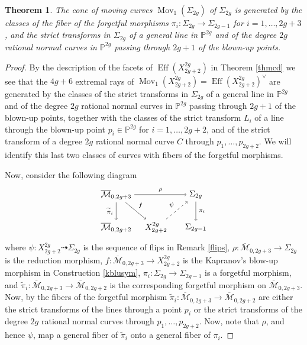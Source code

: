 \documentclass[a4paper,10pt]{amsart}
\newtheorem{thm}{Theorem}[section]
\theoremstyle{definition}
\DeclareMathOperator{\Eff}{Eff}
\DeclareMathOperator{\Mov}{Mov}
\begin{document}
\begin{thm}\label{moving}
The cone of moving curves $\Mov_1(\Sigma_{2g})$ of $\Sigma_{2g}$ is generated by the classes of the fiber of the forgetful morphisms $\pi_i:\Sigma_{2g}\rightarrow\Sigma_{2g-1}$ for $i = 1,\dots,2g+3$, and the strict transforms in $\Sigma_{2g}$ of a general line in $\mathbb{P}^{2g}$ and of the degree $2g$ rational normal curves in $\mathbb{P}^{2g}$ passing through $2g+1$ of the blown-up points. 
\end{thm}
\begin{proof}
By the description of the facets of $\Eff(X^{2g}_{2g+2})$ in Theorem \ref{thmcd} we see that the $4g+6$ extremal rays of $\Mov_1(X^{2g}_{2g+2}) = \Eff(X^{2g}_{2g+2})^{\vee}$ are generated by the classes of the strict transforms in $\Sigma_{2g}$ of a general line in $\mathbb{P}^{2g}$ and of the degree $2g$ rational normal curves in $\mathbb{P}^{2g}$ passing through $2g+1$ of the blown-up points, together with the classes of the strict transform $L_i$ of a line through the blown-up point $p_i\in\mathbb{P}^{2g}$ for $i = 1,\dots,2g+2$, and of the strict transform of a degree $2g$ rational normal curve $C$ through $p_1,\dots,p_{2g+2}$. We will identify this last two classes of curves with fibers of the forgetful morphisms. 

Now, consider the following diagram
\[
  \begin{tikzpicture}[xscale=1.7,yscale=-1.4]
    \node (A0_0) at (0, 0) {$\overline{\mathcal{M}}_{0,2g+3}$};
    \node (A0_2) at (2, 0) {$\Sigma_{2g}$};
    \node (A1_0) at (0, 1) {$\overline{\mathcal{M}}_{0,2g+2}$};
    \node (A1_1) at (1, 1) {$X_{2g+2}^{2g}$};
    \node (A1_2) at (2, 1) {$\Sigma_{2g-1}$};
    \path (A0_0) edge [->,swap]node [auto] {$\scriptstyle{\widetilde{\pi}_i}$} (A1_0);
    \path (A0_0) edge [->]node [auto] {$\scriptstyle{f}$} (A1_1);
    \path (A1_1) edge [->,dashed]node [auto] {$\scriptstyle{\psi}$} (A0_2);
    \path (A0_2) edge [->]node [auto] {$\scriptstyle{\pi_i}$} (A1_2);
    \path (A0_0) edge [->]node [auto] {$\scriptstyle{\rho}$} (A0_2);
  \end{tikzpicture}
  \]
where $\psi: X^{2g}_{2g+2}\dasharrow \Sigma_{2g}$ is the sequence of flips in Remark \ref{flips}, $\rho:\overline{\mathcal{M}}_{0,2g+3}\rightarrow\Sigma_{2g}$ is the reduction morphism, $f:\overline{\mathcal{M}}_{0,2g+3}\rightarrow X^{2g}_{2g+2}$ is the Kapranov's blow-up morphism in Construction \ref{kblusym}, $\pi_i:\Sigma_{2g}\rightarrow\Sigma_{2g-1}$ is a forgetful morphism, and $\widetilde{\pi}_i:\overline{\mathcal{M}}_{0,2g+3}\rightarrow\overline{\mathcal{M}}_{0,2g+2}$ is the corresponding forgetful morphism on $\overline{\mathcal{M}}_{0,2g+3}$. Now, by \cite{Ka} the fibers of the forgetful morphism $\widetilde{\pi}_i:\overline{\mathcal{M}}_{0,2g+3}\rightarrow\overline{\mathcal{M}}_{0,2g+2}$ are either the strict transforms of the lines through a point $p_i$ or the strict transforms of the degree $2g$ rational normal curves through $p_1,\dots,p_{2g+2}$. Now, note that $\rho$, and hence $\psi$, map a general fiber of $\widetilde{\pi}_i$ onto a general fiber of $\pi_i$.


\end{proof}
\end{document}
